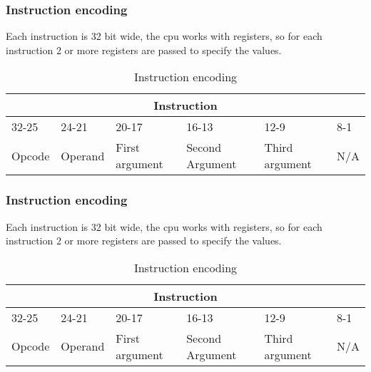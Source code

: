 \documentclass{article}
\begin{document}
\subsubsection{Instruction encoding}
Each instruction is 32 bit wide, the cpu works with registers, so for each instruction 2 or more registers are passed to specify the values.
\begin{table}[h!]
\centering
\begin{tabular} { | p{2cm} | | p{2cm} | p{3cm} | | p{3cm} | | p{3cm}| | p{3cm} |}
  \hline
  \multicolumn{6}{|c|}{Instruction}\\
  \hline
  32-25 & 24-21 & 20-17 & 16-13 & 12-9 & 8-1\\
  \hline
  Opcode & Operand & First argument & Second Argument & Third argument & N/A\\
  \hline
\end{tabular}
\caption{Instruction encoding}
\end{table}
\subsubsection{Instruction encoding}
Each instruction is 32 bit wide, the cpu works with registers, so for each instruction 2 or more registers are passed to specify the values.
\begin{table}[h!]
\centering
\begin{tabular} { | p{2cm} | | p{2cm} | p{3cm} | | p{3cm} | | p{3cm}| | p{3cm} |}
  \hline
  \multicolumn{6}{|c|}{Instruction}\\
  \hline
  32-25 & 24-21 & 20-17 & 16-13 & 12-9 & 8-1\\
  \hline
  Opcode & Operand & First argument & Second Argument & Third argument & N/A\\
  \hline
\end{tabular}
\caption{Instruction encoding}
\end{table}
\end{document}
